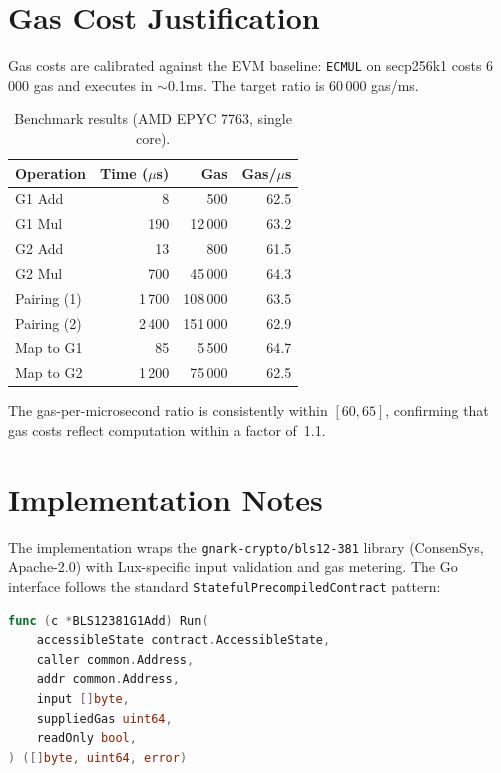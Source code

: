 \documentclass[11pt,a4paper]{article}
\begin{document}
\section{Gas Cost Justification}

Gas costs are calibrated against the EVM baseline: \texttt{ECMUL} on secp256k1
costs 6\,000 gas and executes in $\sim$0.1ms. The target ratio is 60\,000 gas/ms.

\begin{table}[H]
\centering
\caption{Benchmark results (AMD EPYC 7763, single core).}
\begin{tabular}{lrrr}
\toprule
\textbf{Operation} & \textbf{Time ($\mu$s)} & \textbf{Gas} & \textbf{Gas/$\mu$s} \\
\midrule
G1 Add       & 8     & 500    & 62.5 \\
G1 Mul       & 190   & 12\,000 & 63.2 \\
G2 Add       & 13    & 800    & 61.5 \\
G2 Mul       & 700   & 45\,000 & 64.3 \\
Pairing (1)  & 1\,700 & 108\,000 & 63.5 \\
Pairing (2)  & 2\,400 & 151\,000 & 62.9 \\
Map to G1    & 85    & 5\,500  & 64.7 \\
Map to G2    & 1\,200 & 75\,000 & 62.5 \\
\bottomrule
\end{tabular}
\end{table}

The gas-per-microsecond ratio is consistently within $[60, 65]$, confirming that
gas costs reflect computation within a factor of~1.1.

\section{Implementation Notes}

The implementation wraps the \texttt{gnark-crypto/bls12-381} library (ConsenSys,
Apache-2.0) with Lux-specific input validation and gas metering. The Go interface
follows the standard \texttt{StatefulPrecompiledContract} pattern:

\begin{lstlisting}[language=Go]
func (c *BLS12381G1Add) Run(
    accessibleState contract.AccessibleState,
    caller common.Address,
    addr common.Address,
    input []byte,
    suppliedGas uint64,
    readOnly bool,
) ([]byte, uint64, error)
\end{lstlisting}
\end{document}
